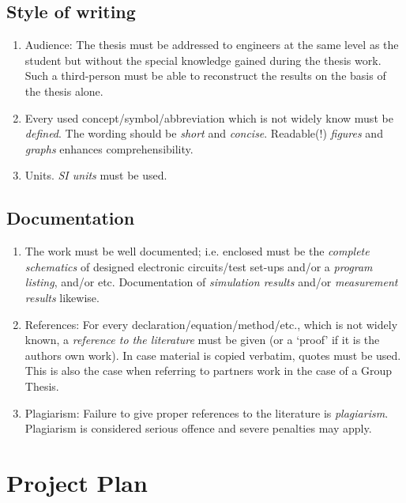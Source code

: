 \section{Style of writing}

\begin{enumerate}

\item Audience:
The thesis must be addressed to engineers at the same level as the
student but without the special knowledge gained during the thesis work.
Such a third-person must be able to reconstruct the results on the basis
of the thesis alone.

\item
Every used concept/symbol/abbreviation which is not widely know must be \emph{defined}.
The wording should be \emph{short} and \emph{concise}.  
Readable(!) \emph{figures} and \emph{graphs} enhances comprehensibility.

\item Units.
\emph{SI units} must be used.
\end{enumerate}

\section{Documentation}

\begin{enumerate}
\item
The work must be well documented; i.e. enclosed must be the \emph{complete
schematics} of designed electronic circuits/test set-ups and/or a
\emph{program listing}, and/or etc.
Documentation of \emph{simulation results} and/or \emph{measurement
results} likewise.
\item References:
For every declaration/equation/method/etc., which is not widely known,
a \emph{reference to the literature} must be given (or a `proof' if it is
the authors own work).
In case material is copied verbatim, quotes must be used.
This is also the case when referring to partners
work in the case of a Group Thesis.

\item Plagiarism:
Failure to give proper references to the literature is \emph{plagiarism}.
Plagiarism is considered serious offence and severe penalties may apply.

\end{enumerate}

\chapter{Project Plan}\label{ch:style}

